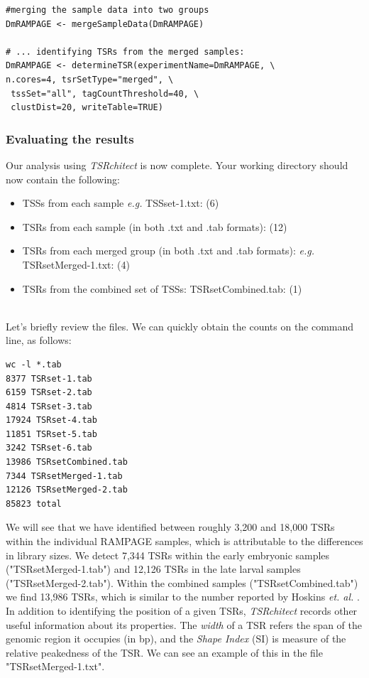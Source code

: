 \documentclass[runningheads,a4paper]{llncs}
\begin{document}
\begin{linenumbers}
\noindent
\begin{verbatim}
#merging the sample data into two groups
DmRAMPAGE <- mergeSampleData(DmRAMPAGE)

# ... identifying TSRs from the merged samples:
DmRAMPAGE <- determineTSR(experimentName=DmRAMPAGE, \
n.cores=4, tsrSetType="merged", \
 tssSet="all", tagCountThreshold=40, \
 clustDist=20, writeTable=TRUE)
\end{verbatim}

\subsubsection{Evaluating the results}
Our analysis using \textit{TSRchitect} is now complete.
Your working directory should now contain the following: 
\begin{itemize}
\item TSSs from each sample \textit{e.g.} TSSset-1.txt: (6)
\item TSRs from each sample (in both .txt and .tab formats): (12)
\item TSRs from each merged group (in both .txt and .tab formats): \textit{e.g.} TSRsetMerged-1.txt: (4)
\item TSRs from the combined set of TSSs: TSRsetCombined.tab: (1)
\end{itemize} \\

Let's briefly review the files. 
We can quickly obtain the counts on the command line, as follows:

\noindent
\begin{verbatim}
wc -l *.tab
8377 TSRset-1.tab
6159 TSRset-2.tab
4814 TSRset-3.tab
17924 TSRset-4.tab
11851 TSRset-5.tab
3242 TSRset-6.tab
13986 TSRsetCombined.tab
7344 TSRsetMerged-1.tab
12126 TSRsetMerged-2.tab
85823 total
\end{verbatim}

We will see that we have identified between roughly 3,200 and 18,000 TSRs within the individual RAMPAGE samples, which is attributable to the differences in library sizes. 
We detect 7,344 TSRs within the early embryonic samples ("TSRsetMerged-1.tab") and 12,126 TSRs in the late larval samples ("TSRsetMerged-2.tab").
Within the combined samples ("TSRsetCombined.tab") we find 13,986 TSRs, which is similar to the number reported by Hoskins \textit{et. al.} \cite{Hoskins:2011io}.\\

In addition to identifying the position of a given TSRs, \textit{TSRchitect} records other useful information about its properties.
The \textit{width} of a TSR refers the span of the genomic region it occupies (in bp), and the \textit{Shape Index} (SI) is measure of the relative peakedness of the TSR.
We can see an example of this in the file "TSRsetMerged-1.txt".


\end{linenumbers}
\end{document}
